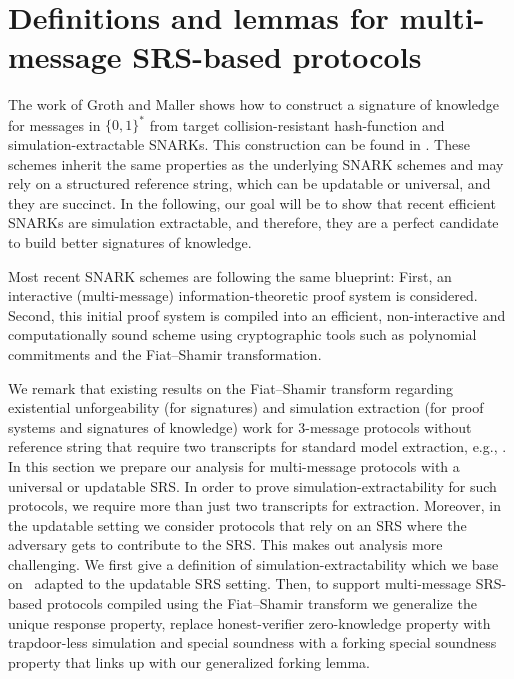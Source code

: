 \section{Definitions and lemmas for multi-message SRS-based protocols}
\label{sec:se_definitions}


  The work of Groth and Maller
\cite{C:GroMal17} shows how to construct a signature of knowledge for messages in
$\{0, 1\}^*$ from target collision-resistant hash-function and simulation-extractable
SNARKs. This construction can be found in .
These schemes inherit the same properties as the underlying SNARK schemes and
may rely on a structured reference string, which can be updatable or universal, and they are
succinct.  In the following, our goal will be to show that recent efficient SNARKs are
simulation extractable, and therefore, they are a perfect candidate to build better
signatures of knowledge.

  Most recent SNARK schemes
are following the same blueprint: First, an interactive (multi-message)
information-theoretic proof system is considered.
Second, this initial proof system is compiled into an efficient, non-interactive and
computationally sound scheme using cryptographic tools such as polynomial commitments
and the Fiat--Shamir transformation.

We remark that existing results on the Fiat--Shamir transform regarding existential
unforgeability (for signatures) and simulation extraction (for proof systems and
signatures of knowledge) work for $3$-message protocols without reference string that
require two transcripts for standard model extraction, e.g.,
\cite{JC:PoiSte00,INDOCRYPT:FKMV12,C:RotSeg21}.  In this section we prepare our
analysis for multi-message protocols with a universal or updatable SRS.  In order to
prove simulation-extractability for such protocols, we require more than just two
transcripts for extraction.  Moreover, in the updatable setting we consider protocols
that rely on an SRS where the adversary gets to contribute to the SRS. This makes out
analysis more challenging.  We first give a definition of simulation-extractability
which we base on~\cite{INDOCRYPT:FKMV12} adapted to the updatable SRS setting. Then,
to support multi-message SRS-based protocols compiled using the Fiat--Shamir transform
we generalize the unique response property, replace honest-verifier zero-knowledge
property with trapdoor-less simulation and special soundness with a forking special
soundness property that links up with our generalized forking lemma.


